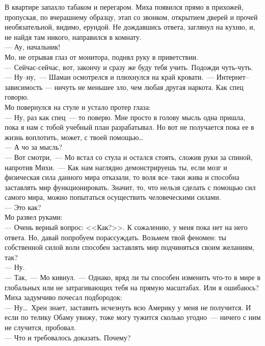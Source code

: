 В квартире запахло табаком и перегаром. Миха появился прямо в прихожей, 
пропуская, по вчерашнему образцу, этап со звонком, открытием дверей и прочей 
необязательной, видимо, ерундой. Не дождавшись ответа, заглянул на кухню, и, не 
найдя там никого, направился в комнату.\\
--- Ау, начальник!\\
Мо, не отрывая глаз от монитора, поднял руку в приветствии.\\
--- Сейчас-сейчас, вот, закончу и сразу же буду тебя учить. Подожди чуть-чуть.\\
--- Ну--ну,~--- Шаман осмотрелся и плюхнулся на край кровати.~--- 
Интернет--зависимость --- ничуть не меньшее зло, чем любая другая наркота. Как спец говорю.\\
Мо повернулся на стуле и устало протер глаза:\\
--- Ну, раз как спец~--- то поверю. Мне просто в голову мысль одна пришла, пока я 
нам с тобой учебный план разрабатывал. Но вот не получается пока ее в жизнь 
воплотить, может, с твоей помощью\ldots\\
--- А чо за мысль?\\
--- Вот смотри,~--- Мо встал со стула и остался стоять, сложив руки за спиной, 
напротив Михи.~--- Как нам наглядно демонстрируешь ты, если мозг и физическая 
сила данного мира отказали, то воля все--таки жива и способна заставлять мир 
функционировать. Значит, то, что нельзя сделать с помощью сил самого мира, 
можно попытаться осуществить человеческими силами.\\
--- Это как?\\
Мо развел руками:\\
--- Очень верный вопрос: <<Как?>>. К сожалению, у меня пока нет на него ответа. 
Но, давай попробуем порассуждать. Возьмем твой феномен: ты собственной силой воли 
способен заставлять мир подчиняться своим желаниям, так?\\
--- Ну.\\
--- Так,~--- Мо кивнул.~--- Однако, вряд ли ты способен изменить что-то в мире в 
глобальных или не затрагивающих тебя на прямую масштабах. Или я ошибаюсь?\\
Миха задумчиво почесал подбородок:\\
--- Ну\ldots\ Хрен знает, заставить исчезнуть всю Америку у меня не получится. И 
если по телику Обаму увижу, тоже могу тужится сколько угодно~--- ничего с ним не 
случится, пробовал.\\
--- Что и требовалось доказать. Почему?\\
